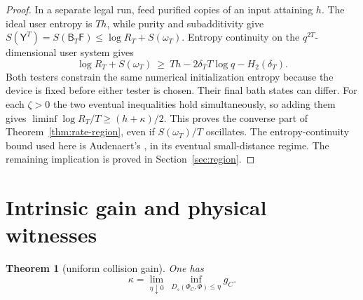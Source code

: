 \documentclass[11pt,a4paper]{article}
\numberwithin{equation}{section}
\theoremstyle{plain}
\newtheorem{theorem}{Theorem}[section]
\theoremstyle{definition}
\newcommand{\rg}[1]{\mathsf{#1}}
\newcommand{\Ddiam}{D_{\diamond}}          %
\begin{document}
\begin{proof}
In a separate legal run, feed purified copies of an input attaining $h$. The
ideal user entropy is $Th$, while purity and subadditivity give
$S(\rg{Y}^T)=S(\rg{B}_T\rg{F})\le\log R_T+S(\omega_T)$. Entropy continuity on
the $q^{2T}$-dimensional user system gives
\begin{equation}
\label{eq:h-budget}
\log R_T+S(\omega_T)\ \ge\ Th-2\delta_T T\log q-H_2(\delta_T).
\end{equation}
Both testers constrain the same numerical initialization entropy because the
device is fixed before either tester is chosen. Their final bath states can
differ. For each $\zeta>0$ the two eventual inequalities hold simultaneously,
so adding them gives $\liminf \log R_T/T\ge(h+\kappa)/2$. This proves the
converse part of Theorem~\ref{thm:rate-region}, even if $S(\omega_T)/T$
oscillates. The entropy-continuity bound used here is Audenaert's
\cite[Theorem 1]{Audenaert2007}, in its eventual small-distance regime. The
remaining implication is proved in Section~\ref{sec:region}.
\end{proof}

\section{Intrinsic gain and physical witnesses}
\label{sec:collision-gain}

\begin{theorem}[uniform collision gain]
\label{thm:uniform-gain}
One has
\[
\kappa=\lim_{\eta\downarrow 0}\ \inf_{\Ddiam(\Phi_C,\Phi)\le\eta} g_C .
\]
\end{theorem}
\end{document}
